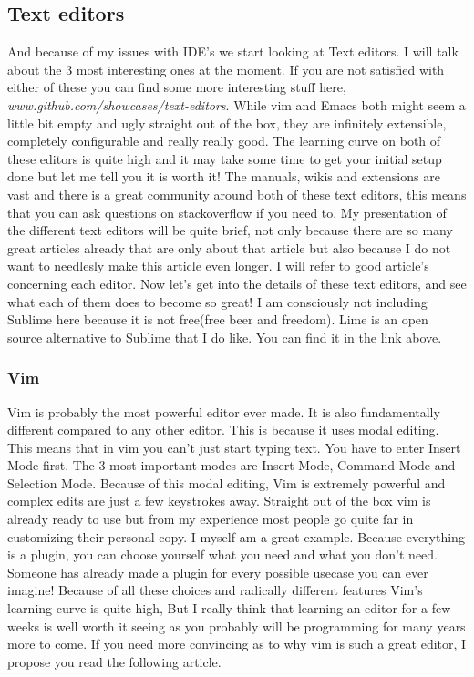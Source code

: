 \documentclass[paper=a4, fontsize=10pt]{scrartcl} %
\numberwithin{equation}{section} %
\numberwithin{figure}{section} %
\numberwithin{table}{section} %
\begin{document}
\subsection{Text editors}
And because of my issues with IDE's we start looking at Text editors. I will
talk about the 3 most interesting ones at the moment. If you are
not satisfied with either of these you can find some more interesting stuff
here, \newline\emph{www.github.com/showcases/text-editors}.\newline 
While vim and Emacs both might seem a little bit empty and ugly straight out of
the box, they are infinitely extensible, completely configurable and really
really good. The learning curve on both of these editors is quite high and it
may take some time to get your initial setup done but let me tell you it is
worth it! The manuals, wikis and extensions are vast and there is a great community around both of these text editors, this means
that you can ask questions on stackoverflow if you need to. My presentation of
the different text editors will be quite brief, not only because there are so
many great articles already that are only about that article but also because I
do not want to needlesly make this article even longer. I will refer to good
article's concerning each editor. Now let's get into
the details of these text editors, and see what each of them does to become so
great!
\newline
\newline
\small %
I am consciously not including Sublime here because it is not free(free beer and freedom). Lime is
an open source alternative to Sublime that I do like. You can find it in the link above.
\normalsize %
\subsubsection{Vim\cite{vim}}
Vim is probably the most powerful editor ever made. It is also fundamentally
different compared to any other editor. This is because it uses modal editing.
This means that in vim you can't just start typing text. You have to enter
Insert Mode first. The 3 most important modes are Insert Mode, Command Mode and
Selection Mode. Because of this modal editing, Vim is extremely powerful and complex edits are
just a few keystrokes away. Straight out of the box vim is already ready to use but
from my experience most people go quite far in customizing their personal copy.
I myself am a great example\cite{numkilvimconf}. Because everything is a
plugin, you can choose yourself what you need and what you don't need. Someone
has already made a plugin for every possible usecase you can ever imagine!
Because of all these choices and radically different features Vim's learning
curve is quite high, But I really think that learning an editor for a few weeks
is well worth it seeing as you probably will be programming for many years more
to come. If you need more convincing as
to why vim is such a great editor, I propose you read the following
article\cite{whousesvi}.
\end{document}

